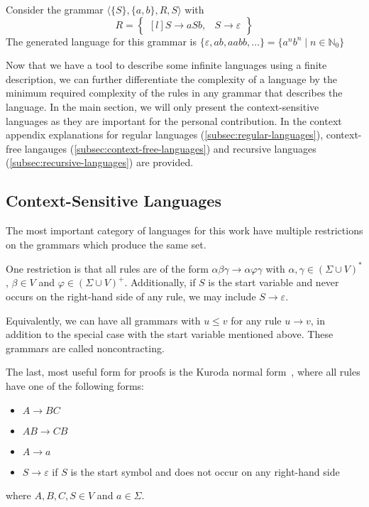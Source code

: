 \begin{exmp}
    Consider the grammar $\langle \{S\}, \{a, b\}, R, S \rangle$ with
    \[
        R = \begin{Bmatrix*}[l]
                S \to aSb,
                &S \to \varepsilon
        \end{Bmatrix*}
    \]
    The generated language for this grammar is $\{\varepsilon, ab, aabb, \dots\} = \{a^{n}b^{n} \mid n \in \mathbb{N}_0\}$
\end{exmp}

Now that we have a tool to describe some infinite languages using a finite description, we can further differentiate the complexity of a language by the minimum required complexity of the rules in any grammar that describes the language.
In the main section, we will only present the context-sensitive languages as they are important for the personal contribution.
In the context appendix explanations for regular languages (\cref{subsec:regular-languages}), context-free langauges (\cref{subsec:context-free-languages}) and recursive languages (\cref{subsec:recursive-languages}) are provided.

\subsection{Context-Sensitive Languages}\label{subsec:context-sensitive-languages}

The most important category of languages for this work have multiple restrictions on the grammars which produce the same set.

One restriction is that all rules are of the form $\alpha\beta\gamma \to \alpha\varphi\gamma$ with $\alpha, \gamma \in (\Sigma \cup V)^{*}$, $\beta \in V$ and $\varphi \in (\Sigma \cup V)^{+}$.
Additionally, if $S$ is the start variable and never occurs on the right-hand side of any rule, we may include $S \to \varepsilon$.

Equivalently, we can have all grammars with $u \leq v$ for any rule $u \to v$, in addition to the special case with the start variable mentioned above.
These grammars are called noncontracting.

The last, most useful form for proofs is the Kuroda normal form~\cite{Pettorossi2022}, where all rules have one of the following forms:
\begin{itemize}
    \setlength\itemsep{0.2em}
    \item $A \to BC$
    \item $AB \to CB$
    \item $A \to a$
    \item $S \to \varepsilon$ if $S$ is the start symbol and does not occur on any right-hand side
\end{itemize}
where $A, B, C, S \in V$ and $a \in \Sigma$.

